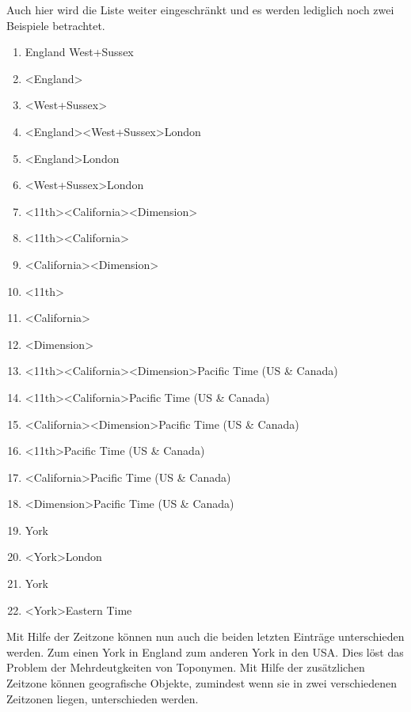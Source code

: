 				Auch hier wird die Liste weiter eingeschränkt und es werden lediglich noch zwei Beispiele betrachtet.
				\begin{multicols}{2}
					\begin{enumerate}
						\item England West+Sussex
						\item \textless England\textgreater  
						\item \textless West+Sussex\textgreater  
						\item \textless England\textgreater   \textless West+Sussex\textgreater   London
						\item \textless England\textgreater   London
						\item \textless West+Sussex\textgreater   London
						\item \textless 11th\textgreater   \textless California\textgreater   \textless Dimension\textgreater    
						\item \textless 11th\textgreater   \textless California\textgreater  
						\item \textless California\textgreater   \textless Dimension\textgreater   
						\item \textless 11th\textgreater  
						\item \textless California\textgreater  
						\item \textless Dimension\textgreater   
						\item \textless 11th\textgreater \textless California\textgreater   \textless Dimension\textgreater   Pacific Time (US \& Canada)
						\item \textless 11th\textgreater   \textless California\textgreater   Pacific Time (US \& Canada)
						\item \textless California\textgreater   \textless Dimension\textgreater   Pacific Time (US \& Canada)
						\item \textless 11th\textgreater   Pacific Time (US \& Canada)
						\item \textless California\textgreater   Pacific Time (US \& Canada)
						\item \textless Dimension\textgreater   Pacific Time (US \& Canada)
						\item York
						\item \textless York\textgreater   London
						\item York
						\item \textless York\textgreater   Eastern Time
					\end{enumerate}	
				\end{multicols}
				Mit Hilfe der Zeitzone können nun auch die beiden letzten Einträge unterschieden werden. 
				Zum einen York in England zum anderen York in den USA. 
				Dies löst das Problem der Mehrdeutgkeiten von Toponymen. 
				Mit Hilfe der zusätzlichen Zeitzone können geografische Objekte, zumindest wenn sie in zwei verschiedenen Zeitzonen liegen, unterschieden werden.

